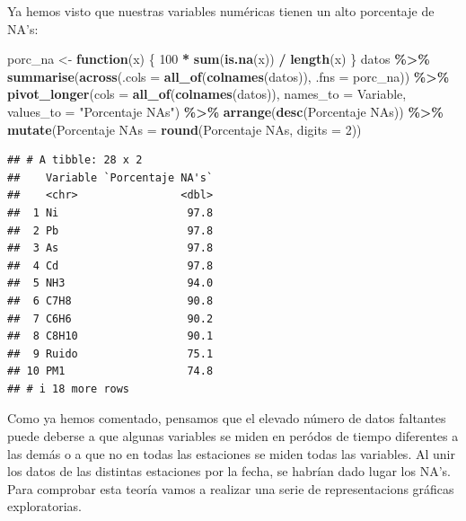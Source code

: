 \documentclass[notspecified,article,submit,moreauthors,pdftex]{Definitions/mdpi}
\newenvironment{Shaded}{\begin{snugshade}}{\end{snugshade}}
\newcommand{\AttributeTok}[1]{\textcolor[rgb]{0.13,0.29,0.53}{#1}}
\newcommand{\ControlFlowTok}[1]{\textcolor[rgb]{0.13,0.29,0.53}{\textbf{#1}}}
\newcommand{\DecValTok}[1]{\textcolor[rgb]{0.00,0.00,0.81}{#1}}
\newcommand{\FunctionTok}[1]{\textcolor[rgb]{0.13,0.29,0.53}{\textbf{#1}}}
\newcommand{\NormalTok}[1]{#1}
\newcommand{\OtherTok}[1]{\textcolor[rgb]{0.56,0.35,0.01}{#1}}
\newcommand{\SpecialCharTok}[1]{\textcolor[rgb]{0.81,0.36,0.00}{\textbf{#1}}}
\newcommand{\StringTok}[1]{\textcolor[rgb]{0.31,0.60,0.02}{#1}}
\begin{document}
Ya hemos visto que nuestras variables numéricas tienen un alto
porcentaje de NA's:

\begin{Shaded}
\begin{Highlighting}[]
\NormalTok{porc\_na }\OtherTok{\textless{}{-}} \ControlFlowTok{function}\NormalTok{(x) \{}
  \DecValTok{100} \SpecialCharTok{*} \FunctionTok{sum}\NormalTok{(}\FunctionTok{is.na}\NormalTok{(x)) }\SpecialCharTok{/} \FunctionTok{length}\NormalTok{(x)}
\NormalTok{\}}
\NormalTok{datos }\SpecialCharTok{\%\textgreater{}\%}
  \FunctionTok{summarise}\NormalTok{(}\FunctionTok{across}\NormalTok{(}\AttributeTok{.cols =} \FunctionTok{all\_of}\NormalTok{(}\FunctionTok{colnames}\NormalTok{(datos)), }\AttributeTok{.fns =}\NormalTok{ porc\_na)) }\SpecialCharTok{\%\textgreater{}\%}
  \FunctionTok{pivot\_longer}\NormalTok{(}\AttributeTok{cols =} \FunctionTok{all\_of}\NormalTok{(}\FunctionTok{colnames}\NormalTok{(datos)),}
               \AttributeTok{names\_to =} \StringTok{\textquotesingle{}Variable\textquotesingle{}}\NormalTok{,}
               \AttributeTok{values\_to =} \StringTok{"Porcentaje NA\textquotesingle{}s"}\NormalTok{) }\SpecialCharTok{\%\textgreater{}\%}
  \FunctionTok{arrange}\NormalTok{(}\FunctionTok{desc}\NormalTok{(}\StringTok{\textasciigrave{}}\AttributeTok{Porcentaje NA\textquotesingle{}s}\StringTok{\textasciigrave{}}\NormalTok{)) }\SpecialCharTok{\%\textgreater{}\%}
  \FunctionTok{mutate}\NormalTok{(}\StringTok{\textasciigrave{}}\AttributeTok{Porcentaje NA\textquotesingle{}s}\StringTok{\textasciigrave{}} \OtherTok{=} \FunctionTok{round}\NormalTok{(}\StringTok{\textasciigrave{}}\AttributeTok{Porcentaje NA\textquotesingle{}s}\StringTok{\textasciigrave{}}\NormalTok{, }\AttributeTok{digits =} \DecValTok{2}\NormalTok{))}
\end{Highlighting}
\end{Shaded}

\begin{verbatim}
## # A tibble: 28 x 2
##    Variable `Porcentaje NA's`
##    <chr>                <dbl>
##  1 Ni                    97.8
##  2 Pb                    97.8
##  3 As                    97.8
##  4 Cd                    97.8
##  5 NH3                   94.0
##  6 C7H8                  90.8
##  7 C6H6                  90.2
##  8 C8H10                 90.1
##  9 Ruido                 75.1
## 10 PM1                   74.8
## # i 18 more rows
\end{verbatim}

Como ya hemos comentado, pensamos que el elevado número de datos
faltantes puede deberse a que algunas variables se miden en peródos de
tiempo diferentes a las demás o a que no en todas las estaciones se
miden todas las variables. Al unir los datos de las distintas estaciones
por la fecha, se habrían dado lugar los NA's. Para comprobar esta teoría
vamos a realizar una serie de representacions gráficas exploratorias.
\end{document}
